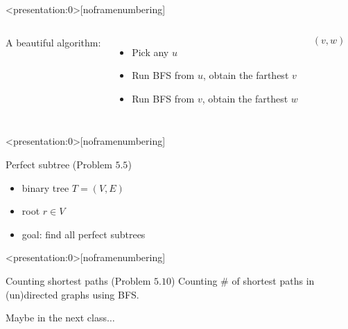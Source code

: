 \begin{frame}<presentation:0>[noframenumbering]
  \centerline{}

  \pause
  \vspace{0.80cm}
  \begin{columns}
      {\large A beautiful algorithm:}
      \begin{itemize}
	\item Pick any $u$
	\item Run BFS from $u$, obtain the farthest $v$
	\item Run BFS from $v$, obtain the farthest $w$
      \end{itemize}
      \[
	(v, w)
      \]
    \pause
      \centerline{}
  \end{columns}

  \pause
  \vspace{0.50cm}
  \centerline{}
\end{frame}

\begin{frame}<presentation:0>[noframenumbering]
  \begin{exampleblock}{Perfect subtree (Problem $5.5$)}
    \begin{itemize}
      \item binary tree $T = (V, E)$
      \item root $r \in V$
      \item goal: find all perfect subtrees
    \end{itemize}
  \end{exampleblock}
\end{frame}

\begin{frame}<presentation:0>[noframenumbering]
  \begin{exampleblock}{Counting shortest paths (Problem $5.10$)}
    Counting \# of shortest paths in (un)directed graphs using BFS.
  \end{exampleblock}

  \pause
  \vspace{0.50cm}
  \centerline{Maybe in the next class$\dots$}
\end{frame}
